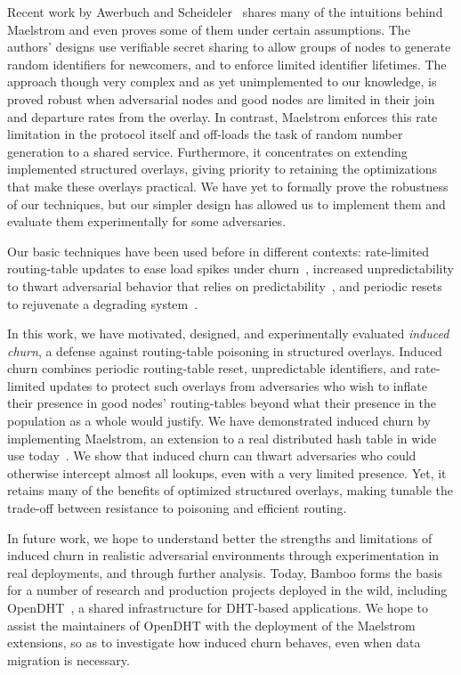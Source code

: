 \documentclass[10pt,twocolumn]{article}
\begin{document}
Recent work by Awerbuch and
Scheideler~\cite{Awerbuch2004,Scheideler2005} shares
many of the intuitions behind Maelstrom and even proves some of them
under certain assumptions. The authors' designs use verifiable secret sharing to allow
groups of nodes to generate random identifiers for newcomers, and to enforce
limited identifier lifetimes.  The approach though very complex and as
yet unimplemented to our knowledge, is proved 
robust when adversarial nodes and good nodes are limited in their join
and departure rates from the overlay.  In contrast, Maelstrom 
enforces this rate limitation in the protocol itself and
off-loads the task of random number generation to a shared service.
Furthermore, it concentrates on extending implemented structured overlays, giving
priority to retaining the optimizations that make these overlays practical.
We have yet to formally prove the robustness of our techniques, but our
simpler design has allowed us to implement them and evaluate them
experimentally for some adversaries.

Our basic techniques have been used before in different contexts:
rate-limited routing-table updates to ease load spikes under
churn~\cite{Rhea2004}, increased unpredictability to thwart adversarial
behavior that relies on predictability~\cite{Kc2003}, and periodic
resets to rejuvenate a degrading system~\cite{Candea2004,Castro2000}.




In this work, we have motivated, designed, and experimentally evaluated
\emph{induced churn}, a defense against routing-table poisoning in structured
overlays.  Induced churn combines periodic routing-table reset,
unpredictable identifiers, and rate-limited updates to protect such
overlays from adversaries who wish to inflate their presence in good nodes'
routing-tables beyond what their presence in the population as a
whole would justify.  We have demonstrated induced churn by implementing Maelstrom, an
extension to a real distributed hash table in wide use
today~\cite{Rhea2004}.
We show that induced churn can thwart adversaries who could otherwise intercept almost all
lookups, even with a very limited presence.
Yet, it retains many of the benefits of optimized structured
overlays, making tunable the trade-off between resistance to poisoning and efficient routing.

In future work, we hope to understand better the strengths and
limitations of induced churn in realistic adversarial environments
through experimentation in real deployments, and through further analysis.
Today, Bamboo forms the basis for a number of research and production projects
deployed in the wild, including OpenDHT~\cite{Rhea2005}, a shared
infrastructure for DHT-based applications.  We hope to assist the
maintainers of OpenDHT with the deployment of the Maelstrom extensions,
so as to investigate how induced churn behaves, even when data migration
is necessary.
\end{document}
